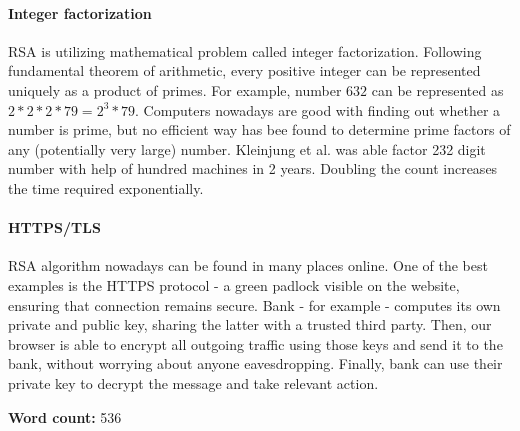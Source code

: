 \documentclass[11pt]{article}
\begin{document}
\begin{multicols}{2}
\paragraph{Integer factorization}
RSA is utilizing mathematical problem called integer factorization. Following fundamental theorem of arithmetic, every positive integer can be represented uniquely as a product of primes. For example, number $632$ can be represented as $2*2*2*79 = 2^3 * 79$. Computers nowadays are good with finding out whether a number is prime, but no efficient way has bee found to determine prime factors of any (potentially very large) number. Kleinjung et al. was able factor 232 digit number with help of hundred machines in 2 years.\cite{kleinjung2010factorization} Doubling the count increases the time required exponentially. 

\paragraph{HTTPS/TLS}
RSA algorithm nowadays can be found in many places online. One of the best examples is the HTTPS protocol - a green padlock visible on the website, ensuring that connection remains secure. Bank - for example - computes its own private and public key, sharing the latter with a trusted third party. Then, our browser is able to encrypt all outgoing traffic using those keys and send it to the bank, without worrying about anyone eavesdropping. Finally, bank can use their private key to decrypt the message and take relevant action.

\nocite{*}

\end{multicols}

\begin{figure}%
    \centering
    \qquad
    \label{fig:example}%
  \end{figure}




{\huge \textbf{Word count:} 536}
\end{document}

